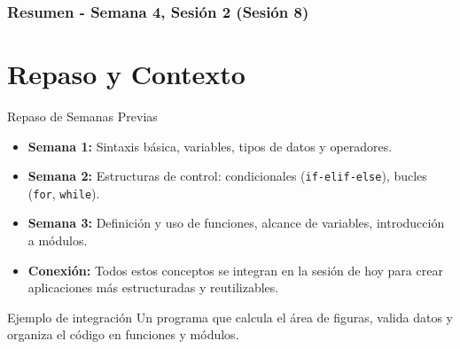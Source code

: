 \documentclass[10pt]{beamer}
\begin{document}
\myfront{}

\begin{frame}
  \titlepage
\end{frame}

\begin{frame}
  \frametitle{Resumen - Semana 4, Sesión 2 (Sesión 8)}
  \tableofcontents
\end{frame}

\section{Repaso y Contexto}

\begin{frame}{Repaso de Semanas Previas}
  \begin{itemize}
    \item \textbf{Semana 1:} Sintaxis básica, variables, tipos de datos y operadores.
    \item \textbf{Semana 2:} Estructuras de control: condicionales (\texttt{if-elif-else}), bucles (\texttt{for}, \texttt{while}).
    \item \textbf{Semana 3:} Definición y uso de funciones, alcance de variables, introducción a módulos.
    \item \textbf{Conexión:} Todos estos conceptos se integran en la sesión de hoy para crear aplicaciones más estructuradas y reutilizables.
  \end{itemize}
  \begin{block}{Ejemplo de integración}
    Un programa que calcula el área de figuras, valida datos y organiza el código en funciones y módulos.
  \end{block}
\end{frame}
\end{document}

